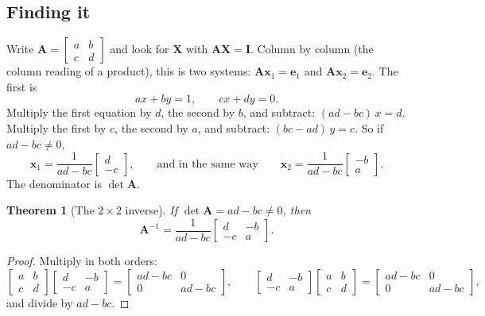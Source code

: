 \documentclass[11pt]{article}
\theoremstyle{plain}
\newtheorem{thm}{Theorem}[section]
\theoremstyle{definition}
\theoremstyle{remark}
\newcommand{\vc}[1]{\mathbf{#1}}
\newcommand{\mt}[1]{\mathbf{#1}}
\begin{document}
\subsection{Finding it}
Write $\mt{A}=\begin{bmatrix}a&b\\c&d\end{bmatrix}$ and look for $\mt{X}$ with
$\mt{A}\mt{X}=\mt{I}$. Column by column (the column reading of a product), this
is two systems: $\mt{A}\vc{x}_1=\vc{e}_1$ and $\mt{A}\vc{x}_2=\vc{e}_2$. The
first is
\[
  ax+by=1,\qquad cx+dy=0 .
\]
Multiply the first equation by $d$, the second by $b$, and subtract:
$(ad-bc)\,x=d$. Multiply the first by $c$, the second by $a$, and subtract:
$(bc-ad)\,y=c$. So if $ad-bc\neq0$,
\[
  \vc{x}_1=\frac{1}{ad-bc}\begin{bmatrix}d\\-c\end{bmatrix},
  \qquad\text{and in the same way}\qquad
  \vc{x}_2=\frac{1}{ad-bc}\begin{bmatrix}-b\\a\end{bmatrix}.
\]
The denominator is $\det\mt{A}$.

\begin{thm}[The $2\times2$ inverse]
\label{thm:inv2}
If $\det\mt{A}=ad-bc\neq0$, then
\[
  \boxed{\;\mt{A}^{-1}=\frac{1}{ad-bc}\begin{bmatrix}d&-b\\-c&a\end{bmatrix}.\;}
\]
\end{thm}

\begin{proof}
Multiply in both orders:
\[
  \begin{bmatrix}a&b\\c&d\end{bmatrix}\begin{bmatrix}d&-b\\-c&a\end{bmatrix}
  =\begin{bmatrix}ad-bc&0\\0&ad-bc\end{bmatrix},
  \qquad
  \begin{bmatrix}d&-b\\-c&a\end{bmatrix}\begin{bmatrix}a&b\\c&d\end{bmatrix}
  =\begin{bmatrix}ad-bc&0\\0&ad-bc\end{bmatrix},
\]
and divide by $ad-bc$.
\end{proof}
\end{document}
